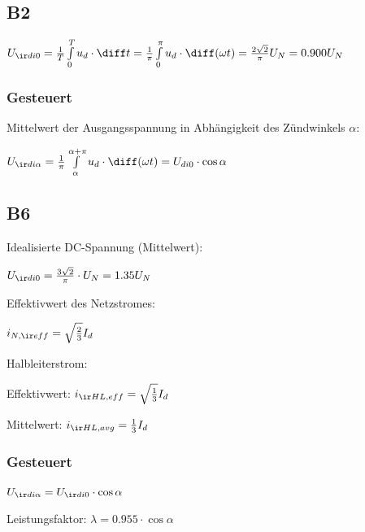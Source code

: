 \documentclass[german]{latex4ei_fs}
\begin{document}
 \begin{sectionbox}
 \subsection{B2}
$U_{\ir di0} = \frac{1}{T} \int \limits_0^T u_d \cdot \diff t = \frac{1}{\pi} \int \limits_0^\pi u_d \cdot \diff (\omega t) = \frac{2 \sqrt 2}{\pi} U_N = 0.900 U_N$
 
\subsubsection{Gesteuert}
Mittelwert der Ausgangsspannung in Abhängigkeit des Zündwinkels $\alpha$:

$U_{\ir di \alpha} = \frac{1}{\pi} \int \limits_\alpha^{\alpha + \pi} u_d \cdot \diff (\omega t) = U_{di 0} \cdot \cos \alpha$ 
 \subsection{B6}
 Idealisierte DC-Spannung (Mittelwert): 

$U_{\ir di0} = \frac{3 \sqrt 2}{\pi} \cdot U_N = 1.35 U_N$

Effektivwert des Netzstromes:

$i_{N, \ir eff} = \sqrt{\frac{2}{3}} I_d $

Halbleiterstrom:

Effektivwert: $i_{\ir HL, eff} = \sqrt{\frac{1}{3}} I_d$

Mittelwert: $i_{\ir HL,  avg} = \frac{1}{3} I_d$

\subsubsection{Gesteuert}

$U_{\ir di \alpha} = U_{\ir di0} \cdot \cos \alpha$

Leistungsfaktor: $\lambda = 0.955 \cdot \cos \alpha$
 \end{sectionbox}
\end{document}
